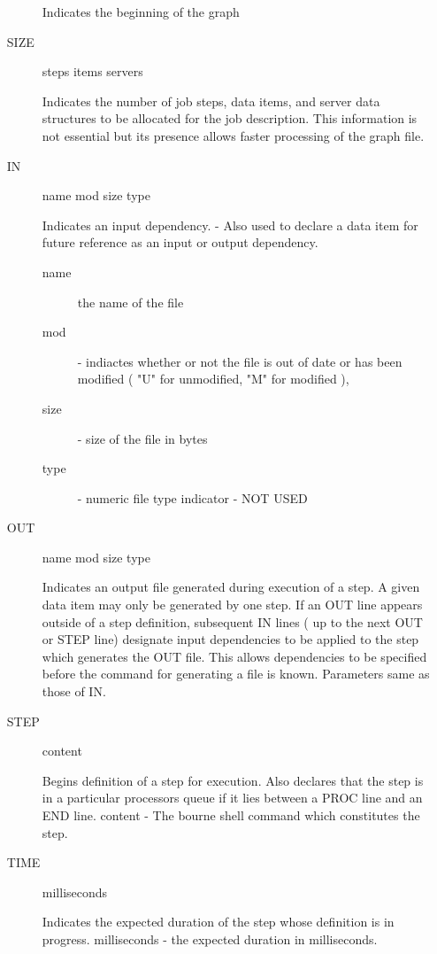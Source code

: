 \begin{itemize}
\begin{description}
       Indicates the beginning of the graph

\item[SIZE]   steps items servers

       Indicates the number of job steps, data items, and server data
       structures to be allocated for the job description.  This information
       is not essential but its presence allows faster processing of the graph
       file.

\item[IN]     name mod size type

       Indicates an input dependency. - Also used to declare a data item for
       future reference as an input or output dependency.
\begin{description}
\item[name] the name of the file
\item[mod] - indiactes whether or not the file is out of date or has been
             modified  ( "U" for unmodified, "M" for modified ), 
\item[size] - size of the file in bytes
\item[type] - numeric file type indicator - NOT USED
\end{description}
       
\item[OUT]    name mod size type

       Indicates an output file generated during execution of a step.  A given
       data item may only be generated by one step.  If an OUT line appears
       outside of a step definition, subsequent IN lines ( up to the next
       OUT or STEP line) designate input dependencies to be applied to the
       step which generates the OUT file.  This allows dependencies to be
       specified before the command for generating a file is known.
       Parameters same as those of IN.

\item[STEP]   content

       Begins definition of a step for execution.  Also declares that the step
       is in a particular processors queue if it lies between a PROC line
       and an END line.
       content - The bourne shell command which constitutes the step.
    
\item[TIME]   milliseconds

       Indicates the expected duration of the step whose definition is in
       progress.
       milliseconds - the expected duration in milliseconds.


\end{description}
\end{itemize}
